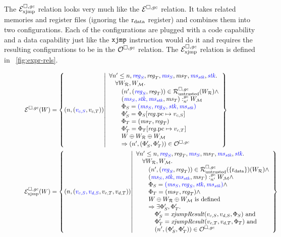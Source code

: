 \begin{jversion}
The $\mathcal{E}^{\square,\mathit{gc}}_{\mathrm{xjmp}}$ relation looks very much like the $\mathcal{E}^{\square,\mathit{gc}}$ relation.
It takes related memories and register files (ignoring the $\mathrm{r}_\mathrm{data}$ register) and combines them into two configurations.
Each of the configurations are plugged with a code capability and a data capability just like the $\txjmp{}{}$ instruction would do it and requires the resulting configurations to be in the $\mathcal{O}^{\square,\mathit{gc}}$ relation.
The $\mathcal{E}^{\square,\mathit{gc}}_{\mathrm{xjmp}}$ relation is defined in \figurename~\ref{fig:expr-rels}.
\begin{figure}
  \centering
  \begin{align*}
  \lre(W) &= \left\{ \npair{\stpair[.]{v_{c,S}}{v_{c,T}}} \middle| 
    \begin{array}{l}
      \forall n' \leq n, \src{\reg_S}, \reg_T, \src{\ms_S}, \ms_T, \src{\ms_\stk}, \src{\stk} \ldotp\\
      \quad \forall W_\lrrs , W_\lrm \ldotp \\
      \qquad\npair[n']{\stpair{\reg}{\reg}} \in \lrr(W_\lrrs ) \wedge\\
      \qquad\memSat[n']{\stpair[.]{\ms_S,\stk,\ms_\stk}{\ms_T}}{W_\lrm} \\
      \qquad\Phi_S = \src{(\ms_S,\reg_S,\stk, \ms_\stk)}\\
      \qquad \Phi_S' = \Phi_S \updReg{\pcreg}{v_{c,S}}\\
      \qquad\Phi_T = (\ms_T,\reg_T)\\
      \qquad\Phi_T' = \Phi_T\updReg{\pcreg}{v_{c,T}}\\
      \qquad W \oplus W_\lrrs \oplus W_\lrm\\
      \qquad\Rightarrow\npair[n']{\left(\Phi_S', \Phi_T' \right)}\in \lro
    \end{array}
    \right\}
\\  \lrexj(W) &= \left\{ \npair{\stpair[.]{v_{c,S},v_{d,S}}{v_{c,T},v_{d,T}}} \middle| 
    \begin{array}{l}
      \forall n' \leq n, \src{\reg_S}, \reg_T, \src{\ms_S}, \ms_T, \src{\ms_\stk}, \src{\stk} \ldotp\\
      \quad \forall W_\lrrs , W_\lrm \ldotp \\
      \qquad\npair[n']{\stpair{\reg}{\reg}} \in \lrr(\{\rdata\}) (W_\lrrs ) \wedge\\
      \qquad\memSat[n']{\stpair[.]{\ms_S,\stk,\ms_\stk}{\ms_T}}{W_\lrm} \wedge \\
      \qquad\Phi_S = \src{(\ms_S,\reg_S,\stk, \ms_\stk)}\wedge\\
      \qquad\Phi_T = (\ms_T,\reg_T) \wedge\\
      \qquad W \oplus W_\lrrs \oplus W_\lrm \text{ is defined }\\
      \qquad\Rightarrow \exists \Phi_S',\Phi_T'\ldotp\\
      \quad\qquad \Phi_S' = \xjumpResult{v_{c,S}}{v_{d,S}}{\Phi_S} \tand\\
      \quad\qquad\Phi_T' = \xjumpResult{v_{c,T}}{v_{d,T}}{\Phi_T}\tand\\
      \quad\qquad\npair[n']{\left(\Phi_S', \Phi_T' \right)}\in \lro
    \end{array}
    \right\}
\end{align*}


\end{figure}
\end{jversion}
